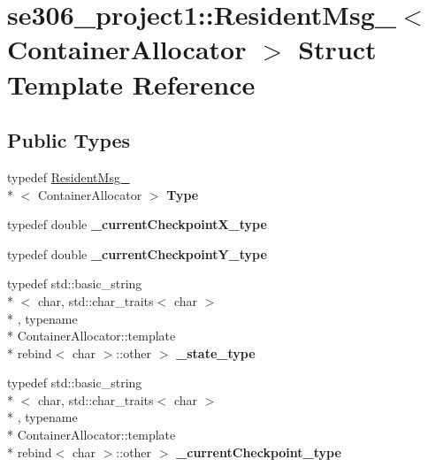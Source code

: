 \hypertarget{structse306__project1_1_1ResidentMsg__}{\section{se306\-\_\-project1\-:\-:Resident\-Msg\-\_\-$<$ Container\-Allocator $>$ Struct Template Reference}
\label{structse306__project1_1_1ResidentMsg__}
}
\subsection*{Public Types}
\begin{DoxyCompactItemize}
\item 
\hypertarget{structse306__project1_1_1ResidentMsg___a333e27c02fbdf82c901465a81a269879}{typedef \hyperlink{structse306__project1_1_1ResidentMsg__}{Resident\-Msg\-\_\-}\\*
$<$ Container\-Allocator $>$ {\bfseries Type}}\label{structse306__project1_1_1ResidentMsg___a333e27c02fbdf82c901465a81a269879}

\item 
\hypertarget{structse306__project1_1_1ResidentMsg___a6b445d2d307a6fd1fc69d568184ce3bc}{typedef double {\bfseries \-\_\-current\-Checkpoint\-X\-\_\-type}}\label{structse306__project1_1_1ResidentMsg___a6b445d2d307a6fd1fc69d568184ce3bc}

\item 
\hypertarget{structse306__project1_1_1ResidentMsg___a57cbeccc1d9a09e184648aad4cc33663}{typedef double {\bfseries \-\_\-current\-Checkpoint\-Y\-\_\-type}}\label{structse306__project1_1_1ResidentMsg___a57cbeccc1d9a09e184648aad4cc33663}

\item 
\hypertarget{structse306__project1_1_1ResidentMsg___a18975e7e3c2118a7e6a22711b7e609b1}{typedef std\-::basic\-\_\-string\\*
$<$ char, std\-::char\-\_\-traits$<$ char $>$\\*
, typename \\*
Container\-Allocator\-::template \\*
rebind$<$ char $>$\-::other $>$ {\bfseries \-\_\-state\-\_\-type}}\label{structse306__project1_1_1ResidentMsg___a18975e7e3c2118a7e6a22711b7e609b1}

\item 
\hypertarget{structse306__project1_1_1ResidentMsg___a9478e72b91b6e6a025430914d5ea923f}{typedef std\-::basic\-\_\-string\\*
$<$ char, std\-::char\-\_\-traits$<$ char $>$\\*
, typename \\*
Container\-Allocator\-::template \\*
rebind$<$ char $>$\-::other $>$ {\bfseries \-\_\-current\-Checkpoint\-\_\-type}}\label{structse306__project1_1_1ResidentMsg___a9478e72b91b6e6a025430914d5ea923f}


\end{DoxyCompactItemize}
